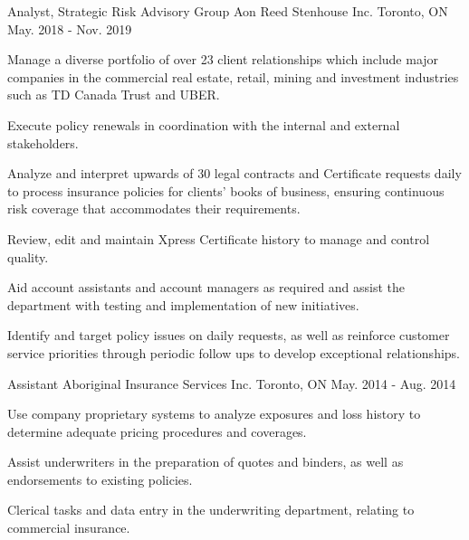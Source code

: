 \begin{cventries}
\cventry
{Analyst, Strategic Risk Advisory Group} %
{Aon Reed Stenhouse Inc.} %
{Toronto, ON} %
{May. 2018 - Nov. 2019} %
{ %
\begin{cvitems}
\item {Manage a diverse portfolio of over 23 client relationships which include major companies in the commercial real estate, retail, mining and investment industries such as TD Canada Trust and UBER.}
\item {Execute policy renewals in coordination with the internal and external stakeholders.}
\item {Analyze and interpret upwards of 30 legal contracts and Certificate requests daily to process insurance policies for clients' books of business, ensuring continuous risk coverage that accommodates their requirements.}
\item {Review, edit and maintain Xpress Certificate history to manage and control quality.}
\item {Aid account assistants and account managers as required and assist the department with testing and implementation of new initiatives.}
\item {Identify and target policy issues on daily requests, as well as reinforce customer service priorities through periodic follow ups to develop exceptional relationships.}
\end{cvitems}
}


\cventry
{Assistant} %
{Aboriginal Insurance Services Inc.} %
{Toronto, ON} %
{May. 2014 - Aug. 2014} %
{ %
\begin{cvitems}
\item {Use company proprietary systems to analyze exposures and loss history to determine adequate pricing procedures and coverages.}
\item {Assist underwriters in the preparation of quotes and binders, as well as endorsements to existing policies.}
\item {Clerical tasks and data entry in the underwriting department, relating to commercial insurance.}
\end{cvitems}
}

\end{cventries}